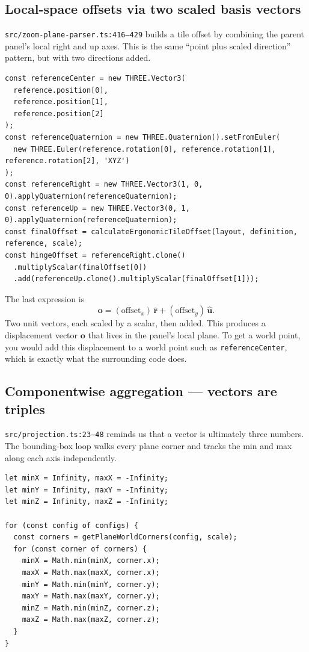\documentclass{article}
\begin{document}
\subsection{Local-space offsets via two scaled basis vectors}

\texttt{src/zoom-plane-parser.ts:416--429} builds a tile offset by combining
the parent panel's local right and up axes. This is the same ``point plus
scaled direction'' pattern, but with two directions added.

\begin{lstlisting}
const referenceCenter = new THREE.Vector3(
  reference.position[0],
  reference.position[1],
  reference.position[2]
);
const referenceQuaternion = new THREE.Quaternion().setFromEuler(
  new THREE.Euler(reference.rotation[0], reference.rotation[1], reference.rotation[2], 'XYZ')
);
const referenceRight = new THREE.Vector3(1, 0, 0).applyQuaternion(referenceQuaternion);
const referenceUp = new THREE.Vector3(0, 1, 0).applyQuaternion(referenceQuaternion);
const finalOffset = calculateErgonomicTileOffset(layout, definition, reference, scale);
const hingeOffset = referenceRight.clone()
  .multiplyScalar(finalOffset[0])
  .add(referenceUp.clone().multiplyScalar(finalOffset[1]));
\end{lstlisting}

The last expression is
\[
\mathbf{o} = (\text{offset}_x)\,\hat{\mathbf{r}} + (\text{offset}_y)\,\hat{\mathbf{u}}.
\]
Two unit vectors, each scaled by a scalar, then added. This produces a
displacement vector $\mathbf{o}$ that lives in the panel's local plane. To
get a world point, you would add this displacement to a world point such as
\texttt{referenceCenter}, which is exactly what the surrounding code does.

\subsection{Componentwise aggregation --- vectors are triples}

\texttt{src/projection.ts:23--48} reminds us that a vector is ultimately
three numbers. The bounding-box loop walks every plane corner and tracks the
min and max along each axis independently.

\begin{lstlisting}
let minX = Infinity, maxX = -Infinity;
let minY = Infinity, maxY = -Infinity;
let minZ = Infinity, maxZ = -Infinity;

for (const config of configs) {
  const corners = getPlaneWorldCorners(config, scale);
  for (const corner of corners) {
    minX = Math.min(minX, corner.x);
    maxX = Math.max(maxX, corner.x);
    minY = Math.min(minY, corner.y);
    maxY = Math.max(maxY, corner.y);
    minZ = Math.min(minZ, corner.z);
    maxZ = Math.max(maxZ, corner.z);
  }
}
\end{lstlisting}
\end{document}
